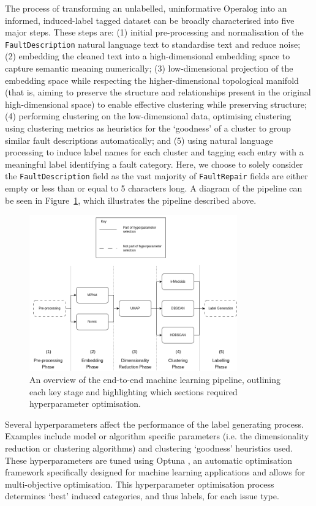 \documentclass[10pt,oneside]{report}
\begin{document}
The process of transforming an unlabelled, uninformative Operalog into an informed, induced-label tagged dataset can be broadly characterised into five major steps. These steps are: (1) initial pre-processing and normalisation of the \texttt{FaultDescription} natural language text to standardise text and reduce noise; (2) embedding the cleaned text into a high-dimensional embedding space to capture semantic meaning numerically; (3) low-dimensional projection of the embedding space while respecting the higher-dimensional topological manifold (that is, aiming to preserve the structure and relationships present in the original high-dimensional space) to enable effective clustering while preserving structure; (4) performing clustering on the low-dimensional data, optimising clustering using clustering metrics as heuristics for the `goodness' of a cluster to group similar fault descriptions automatically; and (5) using natural language processing to induce label names for each cluster and tagging each entry with a meaningful label identifying a fault category.  Here, we choose to solely consider the \texttt{FaultDescription} field as the vast majority of \texttt{FaultRepair} fields are either empty or less than or equal to 5 characters long. A diagram of the pipeline can be seen in Figure~\ref{fig:pipeline}, which illustrates the pipeline described above.

\begin{figure}[htbp]
    \centering
    \includegraphics[width=0.8\textwidth]{pipeline.png}
    \caption{An overview of the end-to-end machine learning pipeline, outlining each key stage and highlighting which sections required hyperparameter optimisation.}\label{fig:pipeline}
\end{figure}

Several hyperparameters affect the performance of the label generating process. Examples include model or algorithm specific parameters (i.e. the dimensionality reduction or clustering algorithms) and clustering `goodness' heuristics used. These hyperparameters are tuned using Optuna \cite{akiba2019optuna}, an automatic optimisation framework specifically designed for machine learning applications and allows for multi-objective optimisation. This hyperparameter optimisation process determines `best' induced categories, and thus labels, for each issue type. 
\end{document}

